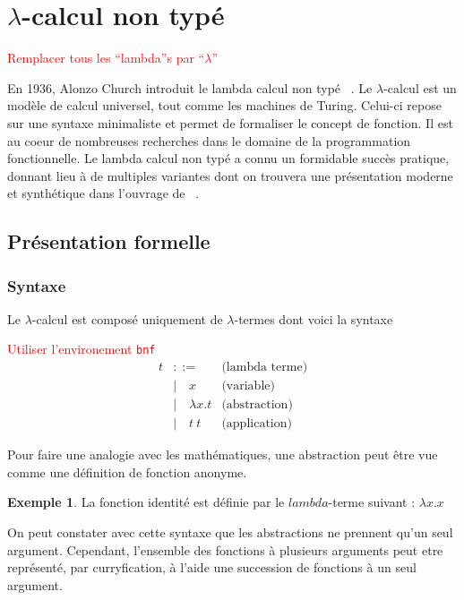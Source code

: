 \documentclass {article}
\theoremstyle{definition}
\newtheorem{example}{Exemple}
\theoremstyle{remark}
\newcommand{\todo}[1]{\textcolor{red}{#1}}
\begin{document}
\section{$\lambda$-calcul non typé}

\todo{Remplacer tous les ``lambda''s par ``$\lambda$''}

En 1936, Alonzo Church introduit le lambda calcul non typé
~\citep{church:lambda-calcul}. Le $\lambda$-calcul est
un modèle de calcul universel, tout comme les machines de Turing. Celui-ci repose
sur une syntaxe minimaliste et permet de formaliser le concept de fonction. Il est au coeur de nombreuses recherches dans le domaine de la 
programmation fonctionnelle. Le lambda calcul non typé a connu un formidable 
succès pratique, donnant lieu à de multiples variantes dont on trouvera une présentation
 moderne et synthétique dans l'ouvrage de ~\citet{pierce:tapl}.


\subsection{Présentation formelle}

\subsubsection{Syntaxe}
Le $\lambda$-calcul est composé uniquement de \(\lambda\)-termes dont voici la syntaxe

\newcommand{\Lam}[2]{\ensuremath{\lambda #1. #2}}
\newcommand{\App}[2]{\ensuremath{#1\:#2}}
\newcommand{\Var}[1]{\ensuremath{#1}}

\todo{Utiliser l'environement \texttt{bnf}}
\begin{align*}
  t &::= & \mbox{(lambda terme)} \\
  &|\quad \Var{x} & \mbox{(variable)} \\
  &|\quad \Lam{x}{t} & \mbox{(abstraction)} \\
  &|\quad \App{t}{t}          & \mbox{(application)}
\end{align*}

Pour faire une analogie avec les mathématiques, une abstraction peut
être vue comme une définition de fonction anonyme.
 
\begin{example}
 La fonction identité est définie par le $lambda$-terme suivant : $\Lam{x}{\Var{x}}$
\end{example}

On peut constater avec cette syntaxe que les abstractions ne prennent
qu'un seul argument. Cependant, l'ensemble des fonctions à plusieurs
arguments peut etre représenté, par curryfication, à l'aide une
succession de fonctions à un seul argument.
\end{document}
